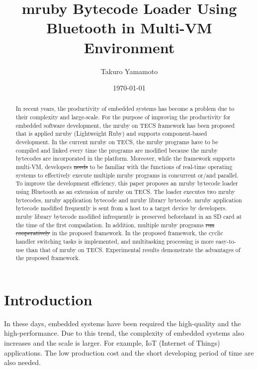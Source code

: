 \documentclass[conference,compsoc]{IEEEtran}
\title{mruby Bytecode Loader Using Bluetooth in Multi-VM Environment}
\author{Takuro Yamamoto}
\date{\today}
\providecommand{\DIFadd}[1]{{\protect\color{blue}\uwave{#1}}} %
\providecommand{\DIFdel}[1]{{\protect\color{red}\sout{#1}}}                      %
\providecommand{\DIFaddbegin}{} %
\providecommand{\DIFaddend}{} %
\providecommand{\DIFdelbegin}{} %
\providecommand{\DIFdelend}{} %
\begin{document}
\maketitle
\begin{abstract}
In recent years, the productivity of embedded systems has become a problem due to their complexity and large-scale.
For the purpose of improving the productivity for embedded software development, the mruby on TECS framework has been proposed that is applied mruby (Lightweight Ruby) and supports component-based development.
In the current mruby on TECS, the mruby programs have to be compiled and linked every time the programs are modified because the mruby bytecodes are incorporated in the platform.
Moreover, while the framework supports multi-VM, developers \DIFdelbegin \DIFdel{needs }\DIFdelend \DIFaddbegin \DIFadd{need }\DIFaddend to be familiar with the functions of real-time operating systems to effectively execute multiple mruby programs in concurrent or/and parallel.
To improve the development efficiency, this paper proposes an mruby bytecode loader using Bluetooth as an extension of mruby on TECS.
The loader executes two mruby bytecodes, mruby application bytecode and mruby library bytecode.
mruby application bytecode modified frequently is sent from a host to a target device by developers.
mruby library bytecode modified infrequently is preserved beforehand in an SD card at the time of the first compailation.
In addition, multiple mruby programs \DIFdelbegin \DIFdel{run cooperatively }\DIFdelend \DIFaddbegin \DIFadd{cooperatively run }\DIFaddend in the proposed framework.
In the proposed framework, the cyclic handler switching tasks is implemented, and multitasking processing is more easy-to-use than that of mruby on TECS.
Experimental results demonstrate the advantages of the proposed framework.
\end{abstract}
\section{Introduction}
In these days, embedded systems have been required the high-quality and the high-performance.
Due to this trend, the complexity of embedded systems also increases and the scale is larger.
For example, IoT (Internet of Things) applications.
The low production cost and the short developing period of time are also needed.
\end{document}
